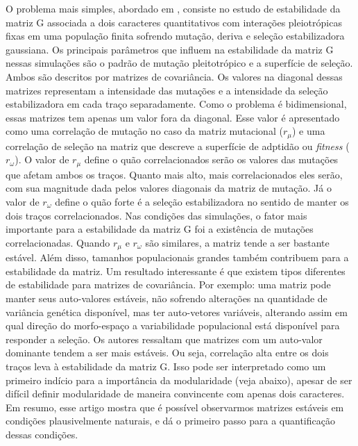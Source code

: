 \documentclass[a4paper, 12pt, titlepage, onecolumn]{article}
\numberwithin{equation}{section}
\numberwithin{table}{section}
\begin{document}
O problema mais simples, abordado em \cite{Jones2003}, consiste no estudo
de estabilidade da matriz G associada a dois caracteres quantitativos
com interações pleiotrópicas fixas em uma população finita sofrendo
mutação, deriva e seleção estabilizadora gaussiana. Os principais
parâmetros que influem na estabilidade da matriz G nessas simulações são
o padrão de mutação pleitotrópico e a superfície de seleção. Ambos são
descritos por matrizes de covariância. Os valores na diagonal dessas
matrizes representam a intensidade das mutações e a intensidade da
seleção estabilizadora em cada traço separadamente. Como o problema é
bidimensional, essas matrizes tem apenas um valor fora da diagonal. Esse
valor é apresentado como uma correlação de mutação no
caso da matriz mutacional ($r_\mu$) e uma correlação de seleção na matriz
que descreve a superfície de adptidão ou {\it fitness} ($r_\omega$). O valor de $r_\mu$
define o quão correlacionados serão os valores das mutações que afetam
ambos os traços. Quanto mais alto, mais correlacionados eles serão, com
sua magnitude dada pelos valores diagonais da matriz de mutação. Já o
valor de $r_\omega$ define o quão forte é a seleção estabilizadora no
sentido de manter os dois traços correlacionados. Nas condições das simulações, o
fator mais importante para a estabilidade da matriz G foi a existência de
mutações correlacionadas. Quando $r_\mu$ e $r_\omega$ são similares, a
matriz tende a ser bastante estável. Além disso, tamanhos populacionais
grandes também contribuem para a estabilidade da matriz.
Um resultado interessante é que existem tipos diferentes de estabilidade
para matrizes de covariância. Por exemplo: uma matriz pode manter seus
auto-valores estáveis, não sofrendo alterações na quantidade de
variância genética disponível, mas ter auto-vetores variáveis, alterando
assim em qual direção do morfo-espaço a variabilidade populacional está
disponível para responder a seleção. Os autores ressaltam que matrizes com um auto-valor
dominante tendem a ser mais estáveis. Ou seja, correlação alta entre os
dois traços leva à estabilidade da matriz G. Isso pode ser interpretado como um
primeiro indício para a importância da modularidade (veja abaixo), apesar de ser
difícil definir modularidade de maneira convincente com apenas dois
caracteres. Em resumo, esse artigo mostra que é possível observarmos
matrizes estáveis em condições plausivelmente naturais, e dá o primeiro
passo para a quantificação dessas condições.
\end{document}
